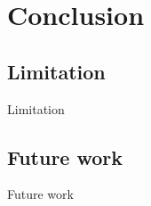 \section{Conclusion}
\subsection{Limitation}
\begin{frame}{Limitation}
    
\end{frame}
\subsection{Future work}
\begin{frame}{Future work}
    
\end{frame}
